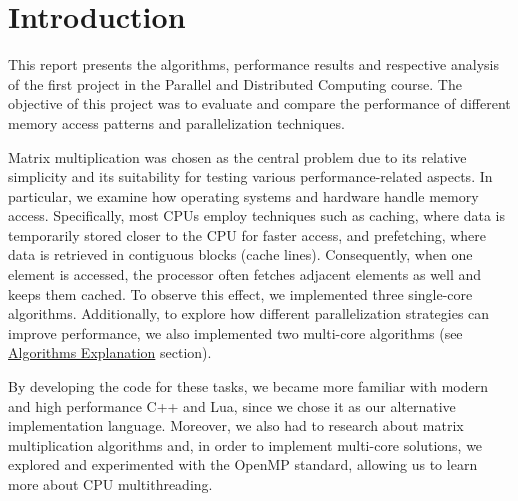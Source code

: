 \section{Introduction} \label{section:introduction}

This report presents the algorithms, performance results and respective analysis of the first project in the Parallel and Distributed Computing course. The objective of this project was to evaluate and compare the performance of different memory access patterns and parallelization techniques.

Matrix multiplication was chosen as the central problem due to its relative simplicity and its suitability for testing various performance-related aspects. In particular, we examine how operating systems and hardware handle memory access. Specifically, most CPUs employ techniques such as caching, where data is temporarily stored closer to the CPU for faster access, and prefetching, where data is retrieved in contiguous blocks (cache lines). Consequently, when one element is accessed, the processor often fetches adjacent elements as well and keeps them cached. To observe this effect, we implemented three single-core algorithms. Additionally, to explore how different parallelization strategies can improve performance, we also implemented two multi-core algorithms (see \hyperref[section:algorithms]{Algorithms Explanation} section).

By developing the code for these tasks, we became more familiar with modern and high performance C++ and Lua, since we chose it as our alternative implementation language. Moreover, we also had to research about matrix multiplication algorithms and, in order to implement multi-core solutions, we explored and experimented with the OpenMP standard, allowing us to learn more about CPU multithreading.
